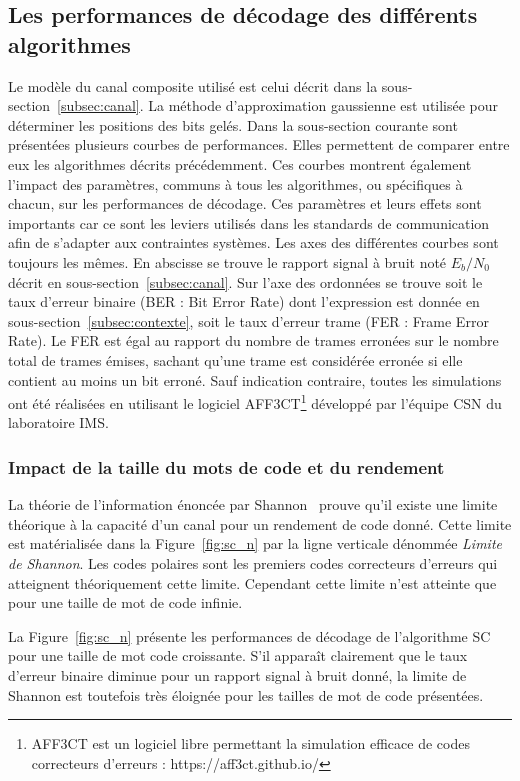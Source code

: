 \subsection{Les performances de décodage des différents algorithmes}
Le modèle du canal composite utilisé est celui décrit dans la sous-section~\ref{subsec:canal}. La méthode d'approximation gaussienne est utilisée pour déterminer les positions des bits gelés. 
Dans la sous-section courante sont présentées plusieurs courbes de performances. 
Elles permettent de comparer entre eux les algorithmes décrits précédemment.
Ces courbes montrent également l'impact des paramètres, communs à tous les algorithmes, ou spécifiques à chacun, sur les performances de décodage.
Ces paramètres et leurs effets sont importants car ce sont les leviers utilisés dans les standards de communication afin de s'adapter aux contraintes systèmes.
Les axes des différentes courbes sont toujours les mêmes.
En abscisse se trouve le rapport signal à bruit noté $E_b/N_0$ décrit en sous-section~\ref{subsec:canal}.
Sur l'axe des ordonnées se trouve soit le taux d'erreur binaire (BER : Bit Error Rate) dont l'expression est donnée en sous-section~\ref{subsec:contexte}, soit le taux d'erreur trame (FER : Frame Error Rate). Le FER est égal au rapport du nombre de trames erronées sur le nombre total de trames émises, sachant qu'une trame est considérée erronée si elle contient au moins un bit erroné. Sauf indication contraire, toutes les simulations ont été réalisées en utilisant le logiciel AFF3CT\footnote{AFF3CT est un logiciel libre permettant la simulation efficace de codes correcteurs d'erreurs : https://aff3ct.github.io/} développé par l'équipe CSN du laboratoire IMS.
  
\subsubsection{Impact de la taille du mots de code et du rendement}

La théorie de l'information énoncée par Shannon~\cite{shannon_mathematical_2001} prouve qu'il existe une limite théorique à la capacité d'un canal pour un rendement de code donné.
Cette limite est matérialisée dans la Figure~\ref{fig:sc_n} par la ligne verticale dénommée \textit{Limite de Shannon}. Les codes polaires sont les premiers codes correcteurs d'erreurs qui atteignent théoriquement cette limite. Cependant cette limite n'est atteinte que pour une taille de mot de code infinie.

La Figure~\ref{fig:sc_n} présente les performances de décodage de l'algorithme SC pour une taille de mot code croissante. S'il apparaît clairement que le taux d'erreur binaire diminue pour un rapport signal à bruit donné, la limite de Shannon est toutefois très éloignée pour les tailles de mot de code présentées. 

